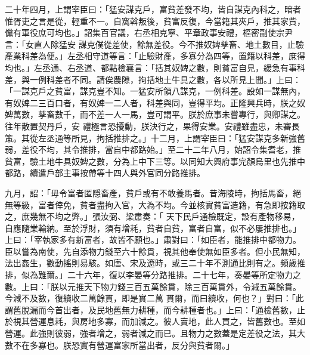 \begin{pinyinscope}
 二十年四月，上謂宰臣曰：「猛安謀克戶，富貧差發不均，皆自謀克內科之，暗者惟胥吏之言是從，輕重不一。自窩斡叛後，貧富反復，今當籍其夾戶，推其家貲，儻有軍役庶可均也。」詔集百官議，右丞相克寧、平章政事安禮，樞密副使宗尹言：「女直人除猛安
 謀克僕從差使，餘無差役。今不推奴婢孳畜、地土數目，止驗產業科差為便。」左丞相守道等言：「止驗財產，多寡分為四等，置籍以科差，庶得均也。」左丞通、右丞道、都點檢襄言：「括其奴婢之數，則貧富自見，緩急有事科差，與一例科差者不同。請俟農隙，拘括地土牛具之數，各以所見上聞。」上曰：「一謀克戶之貧富，謀克豈不知。一猛安所領八謀克，一例科差。設如一謀無內，有奴婢二三百口者，有奴婢一二人者，科差與同，豈得平均。正隆興兵時，朕之奴婢萬數，孳畜數千，而不差一人一馬，豈可謂平。朕於庶事未嘗專行，與卿謀之。往年散置契丹戶，安
 禮極言恐擾動，朕決行之，果得安業。安禮雖盡忠，未審長策。其從左丞通等所見，拘括推排之。」十二月，上謂宰臣曰：「猛安謀克多新強舊弱，差役不均，其令推排，當自中都路始。」至二十二年八月，始詔令集耆老，推貧富，驗土地牛具奴婢之數，分為上中下三等。以同知大興府事完顏烏里也先推中都路，續遣戶部主事按帶等十四人與外官同分路推排。



 九月，詔：「毋令富者匿隱畜產，貧戶或有不敢養馬者。昔海陵時，拘括馬畜，絕無等級，富者倖免，貧者盡拘入官，大為不均。今並核實貧富造籍，有急即按籍取之，庶幾無不均之弊。」張汝弼、梁肅奏：「
 天下民戶通檢既定，設有產物移易，自應隨業輸納。至於浮財，須有增耗，貧者自貧，富者自富，似不必屢推排也。」上曰：「宰執家多有新富者，故皆不願也。」肅對曰：「如臣者，能推排中都物力。臣以嘗為南使，先自添物力錢至六十餘貫，視其他奉使無如臣多者。但小民無知，法出姦生，數動搖則易駭。如唐、宋及遼時，或三二十年不測通比則有之。頻歲推排，似為難爾。」二十六年，復以李晏等分路推排。二十七年，奏晏等所定物力之數。上曰：「朕以元推天下物力錢三百五萬餘貫，除三百萬貫外，令減五萬餘貫。今減不及數，復續收二萬餘貫，即是實二萬
 貫爾，而曰續收，何也？」對曰：「此謂舊脫漏而今首出者，及民地舊無力耕種，而今耕種者也。」上曰：「通檢舊數，止於視其營運息耗，與房地多寡，而加減之。彼人賣地，此人買之，皆舊數也。至如營運。此強則彼弱，強者增之，弱者減之而已。且物力之數蓋是定差役之法，其大數不在多寡也。朕恐實有營運富家所當出者，反分與貧者爾。」




\end{pinyinscope}
